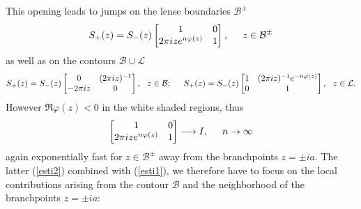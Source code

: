 \documentclass[10pt,oneside,reqno]{amsart}
\numberwithin{equation}{section}
\def\eqref#1{(\ref{#1})}
\begin{document}
This opening leads to jumps on the lense boundaries $\mathcal{B}^{\pm}$
\begin{equation*}
 S_+(z)=S_-(z)\begin{bmatrix}
               1 & 0\\
2\pi ize^{n\varphi(z)} & 1\\
              \end{bmatrix},\hspace{0.5cm}z\in\mathcal{B}^{\pm}
\end{equation*}
as well as on the contours $\mathcal{B}\cup\mathcal{L}$
\begin{equation*}
  S_+(z) = S_-(z)\begin{bmatrix}
                              0 & (2\pi iz)^{-1}\\
-2\pi iz & 0\\
                             \end{bmatrix},\ \ z\in\mathcal{B};\hspace{0.5cm} S_+(z) = S_-(z)\begin{bmatrix}
1 & (2\pi iz)^{-1}e^{-n\varphi(z)}\\
0 & 1\\
\end{bmatrix},\ \ z\in\mathcal{L}.
\end{equation*}
However $\Re\varphi(z)<0$ in the white shaded regions, thus
\begin{equation}\label{esti2}
 \begin{bmatrix}
  1 & 0\\
2\pi i z e^{n\varphi(z)}& 1\\
 \end{bmatrix}\longrightarrow I,\hspace{0.5cm}n\rightarrow\infty
\end{equation}
again exponentially fast for $z\in\mathcal{B}^{\pm}$ away from the branchpoints $z=\pm ia$. The latter \eqref{esti2} combined with \eqref{esti1}, we therefore have to focus
on the local contributions arising from the contour $\mathcal{B}$ and the neighborhood of the branchpoints $z=\pm ia$:\bigskip
\end{document}
